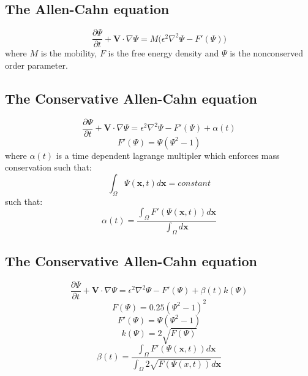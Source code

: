 \documentclass[12pt]{extarticle}
\begin{document}
\subsection*{The Allen-Cahn equation}
\begin{equation}
\frac{\partial \Psi}{\partial t} +  \textbf{V} \cdot \nabla \Psi = M \big( \epsilon^{2} \nabla^{2} \Psi - F'(\Psi) \big)
\end{equation}
where $M$ is the mobility, $F$ is the free energy density and $\Psi$ is the nonconserved order parameter.

\subsection*{The Conservative Allen-Cahn equation}
\begin{equation}
\frac{\partial \Psi}{\partial t} +  \textbf{V} \cdot \nabla \Psi = \epsilon^{2} \nabla^{2} \Psi - F'(\Psi) + \alpha(t)
\end{equation}
\begin{equation}
F'(\Psi)=\Psi(\Psi^{2}-1)
\end{equation}
where $\alpha(t)$ is a time dependent lagrange multipler which enforces mass conservation such that:
\begin{equation}
\int_{\Omega} \Psi(\textbf{x},t) d\textbf{x} = constant
\end{equation}
such that:
\begin{equation}
\alpha(t) = \frac{\int_{\Omega} F'(\Psi(\textbf{x},t)) d\textbf{x}}{\int_{\Omega} d\textbf{x}}
\end{equation}

\subsection*{The Conservative Allen-Cahn equation}
\begin{equation}
\frac{\partial \Psi}{\partial t} +  \textbf{V} \cdot \nabla \Psi = \epsilon^{2} \nabla^{2} \Psi - F'(\Psi) + \beta(t) k(\Psi)
\end{equation}
\begin{equation}
F(\Psi) = 0.25(\Psi^{2}-1)^{2}
\end{equation}
\begin{equation}
F'(\Psi) = \Psi(\Psi^{2}-1)
\end{equation}
\begin{equation}
k(\Psi)= 2 \sqrt{F(\Psi)}
\end{equation}
\begin{equation}
\beta(t) = \frac{\int_{\Omega} F'(\Psi(\textbf{x},t)) d\textbf{x}}{\int_{\Omega} 2 \sqrt{F(\Psi(x,t))} d\textbf{x}}
\end{equation}
\end{document}
